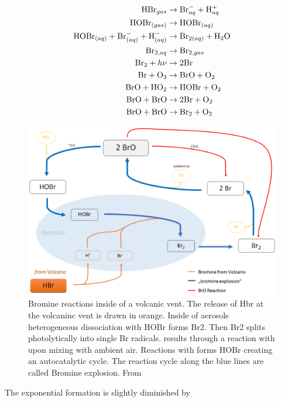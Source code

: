 \documentclass  [
  paper    = a4,
  BCOR     = 10mm,
  twoside,
  fontsize = 12pt,
  fleqn,
  toc      = bibnumbered,
  toc      = listofnumbered,
  numbers  = noendperiod,
  headings = normal,
  listof   = leveldown,
  version  = 3.03
]                                       {scrreprt}
\begin{document}
\begin{align}
\ce{HBr}_{gas} &\rightarrow \ce{Br}^{-}_{aq} + \ce{H}^{+}_{aq}\\
\ce{HOBr}_{(gas)} &\rightarrow \ce{HOBr}_{(aq)} \\
\ce{HOBr}_{(aq)} + \ce{Br}^{-}_{(aq)} + \ce{H}^{-}_{(aq)} &\rightarrow
\ce{Br}_{2(aq)} +  \ce{H2O}\\
\ce{Br}_{2,aq} &\rightarrow \ce{Br}_{2,gas} \\
\ce{Br2} + h\nu &\rightarrow 2 \ce{Br} \\
\ce{Br} + \ce{O3} &\rightarrow \ce{BrO} + \ce{O2} \\
\ce{BrO} + \ce{HO2} &\rightarrow \ce{HOBr} + \ce{O2} \\
\ce{BrO} + \ce{BrO} &\rightarrow 2 \ce{Br} + \ce{O2} \\
\ce{BrO} + \ce{BrO} &\rightarrow \ce{Br2} + \ce{O2}
\end{align}
\begin{figure}
	\centering
	\includegraphics[width=0.7\linewidth]{Bilder/Simon/Bilder_Tung/BrO_Explosion}
	\caption{Bromine reactions inside of a volcanic vent. The release of Hbr at the volcaninc vent is drawn in orange. Inside of aerosols heterogeneous dissociation with HOBr forms Br2. Then Br2 splits photolytically into single Br radicals.   results through a reaction with  upon mixing with ambient air. Reactions with    forms HOBr creating an autocatalytic cycle. The reaction cycle along the blue lines are called Bromine explosion. From \cite{WarnachSimon}}
	\label{fig:broexplosion}
\end{figure}
The exponential   formation is slightly diminished by
\end{document}
